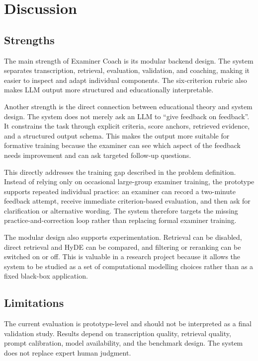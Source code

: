 \section{Discussion}

\subsection{Strengths}
The main strength of Examiner Coach is its modular backend design. The system
separates transcription, retrieval, evaluation, validation, and coaching, making
it easier to inspect and adapt individual components. The six-criterion rubric
also makes LLM output more structured and educationally interpretable.

Another strength is the direct connection between educational theory and system
design. The system does not merely ask an LLM to ``give feedback on feedback''.
It constrains the task through explicit criteria, score anchors, retrieved
evidence, and a structured output schema. This makes the output more suitable
for formative training because the examiner can see which aspect of the
feedback needs improvement and can ask targeted follow-up questions.

This directly addresses the training gap described in the problem definition.
Instead of relying only on occasional large-group examiner training, the
prototype supports repeated individual practice: an examiner can record a
two-minute feedback attempt, receive immediate criterion-based evaluation, and
then ask for clarification or alternative wording. The system therefore targets
the missing practice-and-correction loop rather than replacing formal examiner
training.

The modular design also supports experimentation. Retrieval can be disabled,
direct retrieval and HyDE can be compared, and filtering or reranking can be
switched on or off. This is valuable in a research project because it allows the
system to be studied as a set of computational modelling choices rather than as
a fixed black-box application.

\subsection{Limitations}
The current evaluation is prototype-level and should not be interpreted as a
final validation study. Results depend on transcription quality, retrieval
quality, prompt calibration, model availability, and the benchmark design. The
system does not replace expert human judgment.

